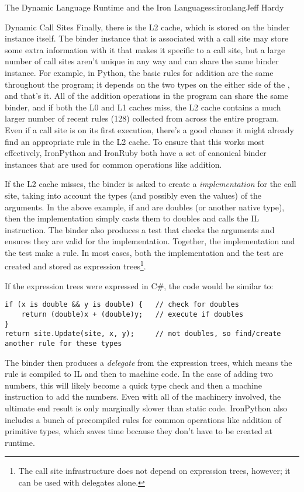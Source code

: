\begin{aosachapter}{The Dynamic Language Runtime and the Iron Languages}{s:ironlang}{Jeff Hardy}
\begin{aosasect1}{Dynamic Call Sites}
Finally, there is the L2 cache, which is stored on the binder instance
itself. The binder instance that is associated with a call site may
store some extra information with it that makes it specific to a call
site, but a large number of call sites aren't unique in any way and
can share the same binder instance. For example, in Python, the basic
rules for addition are the same throughout the program; it depends on
the two types on the either side of the \code{+}, and that's it. All
of the addition operations in the program can share the same binder,
and if both the L0 and L1 caches miss, the L2 cache contains a much
larger number of recent rules (128) collected from across the entire
program. Even if a call site is on its first execution, there's a good
chance it might already find an appropriate rule in the L2 cache. To
ensure that this works most effectively, IronPython and IronRuby both
have a set of canonical binder instances that are used for common
operations like addition.

If the L2 cache misses, the binder is asked to create a
\emph{implementation} for the call site, taking into account the types
(and possibly even the values) of the arguments. In the above example,
if  and  are doubles (or another native type), then
the implementation simply casts them to doubles and calls the IL
 instruction. The binder also produces a test that checks
the arguments and ensures they are valid for the
implementation. Together, the implementation and the test make a
rule. In most cases, both the implementation and the test are created
and stored as expression trees\footnote{The call site infrastructure
  does not depend on expression trees, however; it can be used with
  delegates alone.}.

If the expression trees were expressed in C\#, the code would be
similar to:

\begin{verbatim}
if (x is double && y is double) {   // check for doubles
    return (double)x + (double)y;   // execute if doubles
}
return site.Update(site, x, y);     // not doubles, so find/create another rule for these types
\end{verbatim}

The binder then produces a \emph{delegate} from the expression trees,
which means the rule is compiled to IL and then to machine code. In
the case of adding two numbers, this will likely become a quick type
check and then a machine instruction to add the numbers. Even with all
of the machinery involved, the ultimate end result is only marginally
slower than static code. IronPython also includes a bunch of
precompiled rules for common operations like addition of primitive
types, which saves time because they don't have to be created at
runtime.


\end{aosasect1}
\end{aosachapter}
